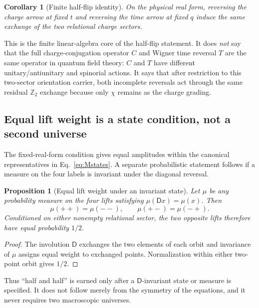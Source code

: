 \documentclass[11pt]{article}
\newtheorem{proposition}[theorem]{Proposition}
\newtheorem{corollary}[theorem]{Corollary}
\theoremstyle{definition}\newtheorem{definition}[theorem]{Definition}
\theoremstyle{remark}\newtheorem{remark}[theorem]{Remark}\newtheorem{conjecture}[theorem]{Conjecture}
\begin{document}
\begin{corollary}[Finite half-flip identity]\label{cor:halfflipidentity}
On the physical real form, reversing the charge arrow at fixed $t$ and reversing the time arrow at fixed $q$ induce the same exchange of the two relational charge sectors.
\end{corollary}

This is the finite linear-algebra core of the half-flip statement. It does \emph{not} say that the full charge-conjugation operator $C$ and Wigner time reversal $T$ are the same operator in quantum field theory: $C$ and $T$ have different unitary/antiunitary and spinorial actions. It says that after restriction to this two-sector orientation carrier, both incomplete reversals act through the same residual $\mathbb Z_2$ exchange because only $\chi$ remains as the charge grading.

\subsection{Equal lift weight is a state condition, not a second universe}
The fixed-real-form condition gives equal amplitudes within the canonical representatives in Eq.~\eqref{eq:Mstates}. A separate probabilistic statement follows if a measure on the four labels is invariant under the diagonal reversal.
\begin{proposition}[Equal lift weight under an invariant state]\label{prop:equalliftweight}
Let $\mu$ be any probability measure on the four lifts satisfying $\mu(\mathsf D x)=\mu(x)$. Then
\begin{equation}
 \mu(++ )=\mu(--),\qquad \mu(+-)=\mu(-+).
\end{equation}
Conditioned on either nonempty relational sector, the two opposite lifts therefore have equal probability $1/2$.
\end{proposition}
\begin{proof}
The involution $\mathsf D$ exchanges the two elements of each orbit and invariance of $\mu$ assigns equal weight to exchanged points. Normalization within either two-point orbit gives $1/2$.
\end{proof}
Thus ``half and half'' is earned only after a $\mathsf D$-invariant state or measure is specified. It does not follow merely from the symmetry of the equations, and it never requires two macroscopic universes.
\end{document}
